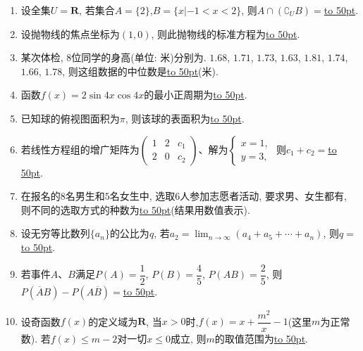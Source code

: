 \documentclass[10pt,a4paper]{article}
\newcommand{\blank}[1]{\underline{\hbox to #1pt{}}}
\begin{document}
\begin{enumerate}[1.]
\item 设全集$U=\mathbf{R}$, 若集合$A=\{2\}$,$B=\{x|-1<x<2\}$, 则$A\cap (\complement_UB)=$\blank{50}.
\item 设抛物线的焦点坐标为$(1,0)$, 则此抛物线的标准方程为\blank{50}.
\item 某次体检, $8$位同学的身高(单位: 米)分别为. $1.68$, $1.71$, $1.73$, $1.63$, $1.81$, $1.74$, $1.66$, $1.78$, 则这组数据的中位数是\blank{50}(米).
\item 函数$f(x)=2\sin 4x \cos 4x$的最小正周期为\blank{50}.
\item 已知球的俯视图面积为$\pi$, 则该球的表面积为\blank{50}.
\item 若线性方程组的增广矩阵为$\begin{pmatrix} 1 & 2 & c_1 \\ 2 & 0 & c_2\end{pmatrix}$、解为$\begin{cases}x=1, \\ y=3,\end{cases}$ 则$c_1+c_2=$\blank{50}.
\item 在报名的$8$名男生和$5$名女生中, 选取$6$人参加志愿者活动, 要求男、女生都有, 则不同的选取方式的种数为\blank{50}(结果用数值表示).
\item 设无穷等比数列$\{a_n\}$的公比为$q$, 若$a_2=\displaystyle\lim_{n\to\infty}(a_4+a_5+\cdots+a_n)$, 则$q=$\blank{50}.
\item 若事件$A$、$B$满足$P(A)=\dfrac12$, $P(B)=\dfrac45$, $P(AB)=\dfrac25$, 则$P(\overline A B)-P(A\overline B)=$\blank{50}.
\item 设奇函数$f(x)$的定义域为$\mathbf{R}$, 当$x>0$时,$f(x)=x+\dfrac{m^2}x-1$(这里$m$为正常数). 若$f(x)\le m-2$对一切$x\le 0$成立, 则$m$的取值范围为\blank{50}.



\end{enumerate}
\end{document}
